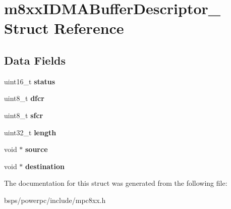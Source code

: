 \hypertarget{structm8xxIDMABufferDescriptor__}{}\section{m8xx\+I\+D\+M\+A\+Buffer\+Descriptor\+\_\+ Struct Reference}
\label{structm8xxIDMABufferDescriptor__}
\subsection*{Data Fields}
\begin{DoxyCompactItemize}
\item 
\mbox{\label{structm8xxIDMABufferDescriptor___af1ee6eb54591b21e1cf36949b08901f4}} 
uint16\+\_\+t {\bfseries status}
\item 
\mbox{\label{structm8xxIDMABufferDescriptor___ac656e8ea9d72ad07cb078e5d24993cce}} 
uint8\+\_\+t {\bfseries dfcr}
\item 
\mbox{\label{structm8xxIDMABufferDescriptor___a09cca449f9d7739788940724635d0729}} 
uint8\+\_\+t {\bfseries sfcr}
\item 
\mbox{\label{structm8xxIDMABufferDescriptor___ac1434f623e0ab1ca5252858bdc1bc13e}} 
uint32\+\_\+t {\bfseries length}
\item 
\mbox{\label{structm8xxIDMABufferDescriptor___aea670169c7771d0f5a782136303bc622}} 
void $\ast$ {\bfseries source}
\item 
\mbox{\label{structm8xxIDMABufferDescriptor___a5d7ef80701b92e6e2b728ace30c3a1ac}} 
void $\ast$ {\bfseries destination}
\end{DoxyCompactItemize}


The documentation for this struct was generated from the following file\+:\begin{DoxyCompactItemize}
\item 
bsps/powerpc/include/mpc8xx.\+h\end{DoxyCompactItemize}
